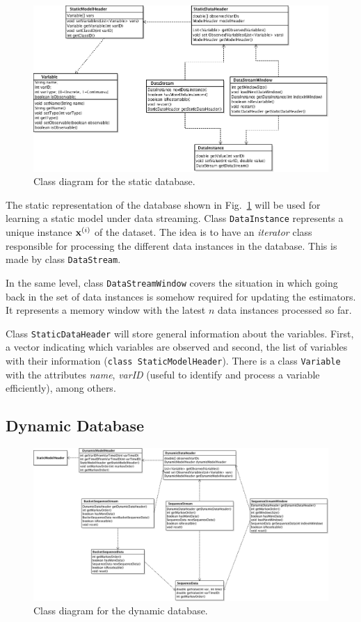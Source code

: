 \documentclass[a4paper,12pt]{article}
\begin{document}
\begin{figure}[h]
\includegraphics[width=\textwidth]{StaticDB}
\caption{Class diagram for the static database.}
\label{fig:staticDB}
\end{figure}

The static representation of the database shown in  Fig.~\ref{fig:staticDB} will be 
used for learning a static model under data streaming. Class 
\texttt{DataInstance} represents a unique instance $\x^{(i)}$ of the dataset. The idea is to
have an \emph{iterator} class responsible for processing the different data instances 
in the database. This is made by class \texttt{DataStream}. 

In the same level, class \texttt{DataStreamWindow} covers the situation in which 
going back in the set of data instances is somehow required for updating the 
estimators. It represents a memory window with the latest $n$ data instances 
processed so far.

Class \texttt{StaticDataHeader} will store general information about the variables. 
First, a vector indicating which variables are observed and second, the list of variables
with their information (\texttt{class StaticModelHeader}). There is a class \texttt{Variable}
with the attributes \emph{name}, \emph{varID} (useful to identify and process a 
variable efficiently), among others.



\subsection{Dynamic Database}
\label{subsec:dynamicDatabase}
\begin{figure}
\includegraphics[width=\textwidth]{DynamicDB}
\caption{Class diagram for the dynamic database.}
\label{fig:dynamicDB}
\end{figure}
\end{document}
